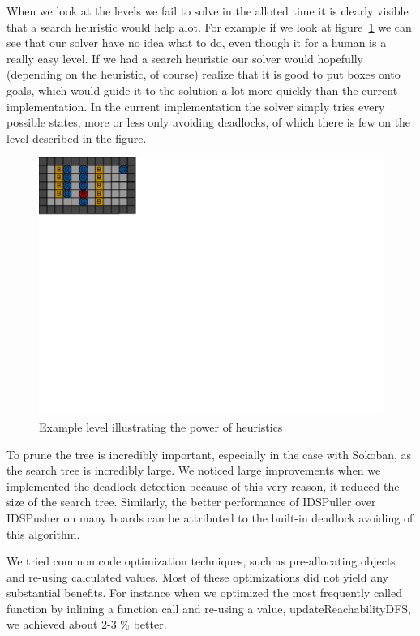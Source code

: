 \documentclass[a4paper,11pt]{article}
\renewcommand{\*}[0]{\cdot}
\begin{document}
When we look at the levels we fail to solve in the alloted time it is clearly
visible that a search heuristic would help alot. For example if we look at
figure~\ref{fig:level136} we can see that our solver have no idea what to do,
even though it for a human is a really easy level. If we had a search heuristic
our solver would hopefully (depending on the heuristic, of course) realize that
it is good to put boxes onto goals, which would guide it to the solution a lot
more quickly than the current implementation. In the current implementation the
solver simply tries every possible states, more or less only avoiding
deadlocks, of which there is few on the level described in the figure.

\begin{figure}[h!]
    \begin{center}
        \includegraphics{figures/level136}
    \end{center}
    \caption{Example level illustrating the power of heuristics}
    \label{fig:level136}
\end{figure}

To prune the tree is incredibly important, especially in the case with Sokoban,
as the search tree is incredibly large. We noticed large improvements when we
implemented the deadlock detection because of this very reason, it reduced the
size of the search tree. Similarly, the better performance of IDSPuller over
IDSPusher on many boards can be attributed to the built-in deadlock avoiding of
this algorithm.

We tried common code optimization techniques, such as pre-allocating objects and
re-using calculated values. Most of these optimizations did not yield any
substantial benefits. For instance when we optimized the most frequently called
function by inlining a function call and re-using a value,
updateReachabilityDFS, we achieved about 2-3 \% better.
\end{document}
